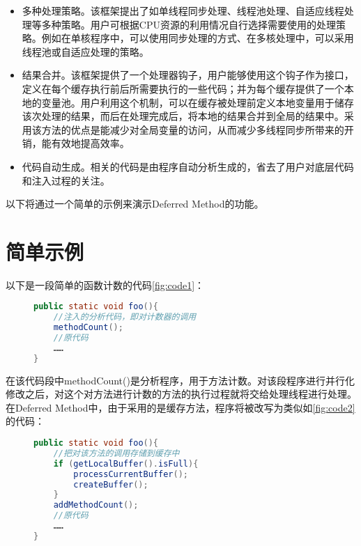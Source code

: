 \begin{itemize}
	\item 多种处理策略。该框架提出了如单线程同步处理、线程池处理、自适应线程处理等多种策略。用户可根据CPU资源的利用情况自行选择需要使用的处理策略。例如在单核程序中，可以使用同步处理的方式、在多核处理中，可以采用线程池或自适应处理的策略。
	\item 结果合并。该框架提供了一个处理器钩子，用户能够使用这个钩子作为接口，定义在每个缓存执行前后所需要执行的一些代码；并为每个缓存提供了一个本地的变量池。用户利用这个机制，可以在缓存被处理前定义本地变量用于储存该次处理的结果，而后在处理完成后，将本地的结果合并到全局的结果中。采用该方法的优点是能减少对全局变量的访问，从而减少多线程同步所带来的开销，能有效地提高效率。
	\item 代码自动生成。相关的代码是由程序自动分析生成的，省去了用户对底层代码和注入过程的关注。
\end{itemize}

以下将通过一个简单的示例来演示Deferred Method的功能。

\section{简单示例}

以下是一段简单的函数计数的代码\ref{fig:code1}：

\begin{figure}[!htp]
\begin{lstlisting}[language=Java]
public static void foo(){
	//注入的分析代码，即对计数器的调用
	methodCount();
	//原代码
	……
}
\end{lstlisting}
\end{figure}

在该代码段中methodCount()是分析程序，用于方法计数。对该段程序进行并行化修改之后，对这个对方法进行计数的方法的执行过程就将交给处理线程进行处理。在Deferred Method中，由于采用的是缓存方法，程序将被改写为类似如\ref{fig:code2}的代码：

\begin{figure}[!htp]
\begin{lstlisting}[language=Java]
public static void foo(){
	//把对该方法的调用存储到缓存中
	if (getLocalBuffer().isFull){
		processCurrentBuffer();
		createBuffer();
	}
	addMethodCount();
	//原代码
	……
}
\end{lstlisting}
\end{figure}

